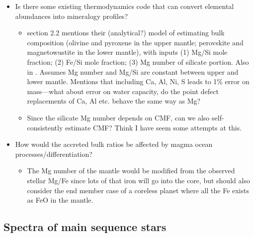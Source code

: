 \documentclass{article}
\begin{document}
\begin{itemize}
\item Is there some existing thermodynamics code that can convert elemental abundances into mineralogy profiles? 
\begin{itemize}
\item \citep{sotinMassRadiusCurve2007} section 2.2 mentions their (analytical?) model of estimating bulk composition (olivine and pyroxene in the upper mantle; perovskite and magnetowustite in the lower mantle), with inputs (1) Mg/Si mole fraction; (2) Fe/Si mole fraction; (3)  Mg number of silicate portion. Also in \citet{grassetStudyAccuracyMassRadius2009}. Assumes Mg number and Mg/Si are constant between upper and lower mantle. Mentions that including Ca, Al, Ni, S leads to 1\% error on mass---what about error on water capacity, do the point defect replacements of Ca, Al etc. behave the same way as Mg?
\item Since the silicate Mg number depends on CMF, can we also self-consistently estimate CMF? Think I have seem some attempts at this.
\end{itemize}
\item How would the accreted bulk ratios be affected by magma ocean processes/differentiation? 
\begin{itemize}
\item The Mg number of the mantle would be modified from the observed stellar Mg/Fe since lots of that iron will go into the core, but should also consider the end member case of a coreless planet where all the Fe exists as FeO in the mantle. \citep[see, e.g.,][]{putirkaCompositionalDiversityRocky2021}
\end{itemize}
\end{itemize}

\subsection{Spectra of main sequence stars}
\end{document}
